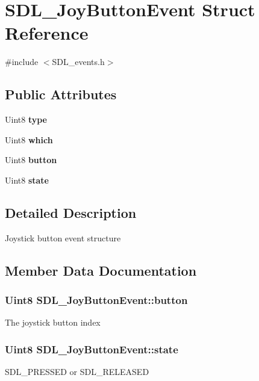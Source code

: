 \section{S\+D\+L\+\_\+\+Joy\+Button\+Event Struct Reference}
\label{struct_s_d_l___joy_button_event}


{\ttfamily \#include $<$S\+D\+L\+\_\+events.\+h$>$}

\subsection*{Public Attributes}
\begin{DoxyCompactItemize}
\item 
Uint8 {\bf type}
\item 
Uint8 {\bf which}
\item 
Uint8 {\bf button}
\item 
Uint8 {\bf state}
\end{DoxyCompactItemize}


\subsection{Detailed Description}
Joystick button event structure 

\subsection{Member Data Documentation}
\subsubsection[{button}]{\setlength{\rightskip}{0pt plus 5cm}Uint8 S\+D\+L\+\_\+\+Joy\+Button\+Event\+::button}\label{struct_s_d_l___joy_button_event_a73ebe4261cf80564052af9c1af737a4d}
The joystick button index 
\subsubsection[{state}]{\setlength{\rightskip}{0pt plus 5cm}Uint8 S\+D\+L\+\_\+\+Joy\+Button\+Event\+::state}\label{struct_s_d_l___joy_button_event_ad3b6f8d9aa2c5e694f664b97d12bcd2b}
S\+D\+L\+\_\+\+P\+R\+E\+S\+S\+E\+D or S\+D\+L\+\_\+\+R\+E\+L\+E\+A\+S\+E\+D 
